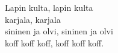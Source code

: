 
            Lapin kulta, lapin kulta \\
            karjala, karjala \\
            sininen ja olvi, sininen ja olvi \\
            koff koff koff, koff koff koff. \\
